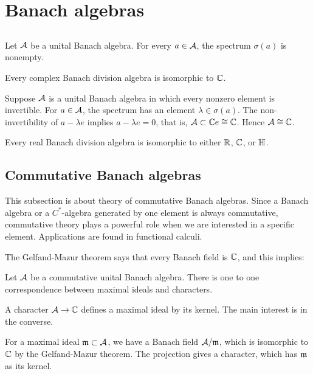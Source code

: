 \documentclass{../crs}
\begin{document}
\section{Banach algebras}

\subsection{}

\begin{thm}
Let $\mathcal{A}$ be a unital Banach algebra.
For every $a\in\mathcal{A}$, the spectrum $\sigma(a)$ is nonempty.
\end{thm}
\begin{thm}
Every complex Banach division algebra is isomorphic to $\mathbb{C}$.
\end{thm}
\begin{pf}
Suppose $\mathcal{A}$ is a unital Banach algebra in which every nonzero element is invertible.
For $a\in\mathcal{A}$, the spectrum has an element $\lambda\in\sigma(a)$.
The non-invertibility of $a-\lambda e$ implies $a-\lambda e=0$, that is, $\mathcal{A}\subset\mathbb{C} e\cong\mathbb{C}$.
Hence $\mathcal{A}\cong\mathbb{C}$.
\end{pf}
\begin{thm}
Every real Banach division algebra is isomorphic to either $\mathbb{R}$, $\mathbb{C}$, or $\H$.
\end{thm}


\subsection{Commutative Banach algebras}
This subsection is about theory of commutative Banach algebras.
Since a Banach algebra or a $C^*$-algebra generated by one element is always commutative, commutative theory plays a powerful role when we are interested in a specific element.
Applications are found in functional calculi.

The Gelfand-Mazur theorem says that every Banach field is $\mathbb{C}$, and this implies:
\begin{thm}
Let $\mathcal{A}$ be a commutative unital Banach algebra.
There is one to one correspondence between maximal ideals and characters.
\end{thm}
\begin{pf}
A character $\cA\to\C$ defines a maximal ideal by its kernel.
The main interest is in the converse.

For a maximal ideal $\mathfrak{m}\subset\mathcal{A}$, we have a Banach field $\mathcal{A}/\mathfrak{m}$, which is isomorphic to $\mathbb{C}$ by the Gelfand-Mazur theorem.
The projection gives a character, which has $\mathfrak{m}$ as its kernel.
\end{pf}
\end{document}
